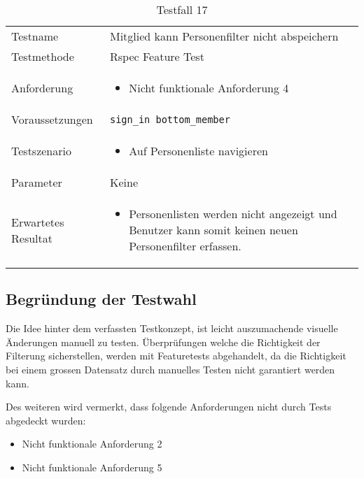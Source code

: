 \begin{table}[h!]
   \begin{tabular}{|L{0.4\textwidth}|L{0.6\textwidth}|}
       \hline
         \\[12pt]
       \hline
        Testname & Mitglied kann Personenfilter nicht abspeichern \\
       \hline
       Testmethode & Rspec Feature Test \\
       \hline
        Anforderung & 
        \begin{itemize}
         \item Nicht funktionale Anforderung 4
         \end{itemize}  \\
       \hline
       Voraussetzungen & \texttt{sign\_in bottom\_member} \\
       \hline
       Testszenario & 
       \begin{itemize}
         \item Auf Personenliste navigieren
       \end{itemize} \\
       \hline
       Parameter & Keine \\
       \hline
       Erwartetes Resultat & 
       \begin{itemize}
         \item Personenlisten werden nicht angezeigt und Benutzer kann somit keinen neuen Personenfilter erfassen.
       \end{itemize} \\
     \hline
     \end{tabular}
     \caption{Testfall 17}
\end{table}

\subsection{Begründung der Testwahl}
Die Idee hinter dem verfassten Testkonzept, ist leicht auszumachende visuelle Änderungen manuell zu testen. Überprüfungen
welche die Richtigkeit der Filterung sicherstellen, werden mit Featuretests abgehandelt, da die Richtigkeit bei einem grossen Datensatz
durch manuelles Testen nicht garantiert werden kann.

Des weiteren wird vermerkt, dass folgende Anforderungen nicht durch Tests abgedeckt wurden:

\begin{itemize}
   \item Nicht funktionale Anforderung 2
   \item Nicht funktionale Anforderung 5
\end{itemize}

